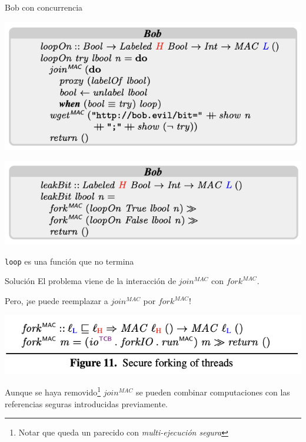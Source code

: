 \documentclass{beamer}
\begin{document}
\begin{frame}{Bob con concurrencia}
    \begin{center}
        \includegraphics[scale=0.7]{codigo_bob4.png}
    \end{center}

    \begin{center}
        \includegraphics[scale=0.7]{codigo_bob5.png}
    \end{center}

    \texttt{loop} es una función que no termina
\end{frame}

\begin{frame}{Solución}
    El problema viene de la interacción de $join^{MAC}$ con $fork^{MAC}$.

    Pero, ¡se puede reemplazar a $join^{MAC}$ por $fork^{MAC}$!

    \begin{center}
        \includegraphics[scale=0.8]{figure11.png}
    \end{center}

    Aunque se haya removido\footnote{Notar que queda un parecido con \textit{multi-ejecución segura}} $join^{MAC}$ se pueden combinar computaciones con las referencias seguras introducidas previamente.
\end{frame}
\end{document}

